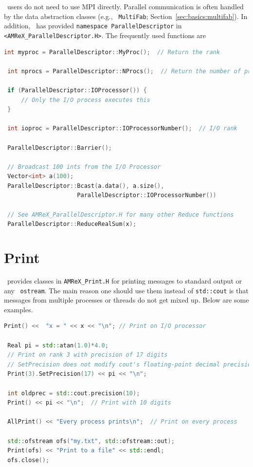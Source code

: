 \amrex\ users do not need to use MPI directly.  Parallel communication
is often handled by the data abstraction classes (e.g., {\tt
  MultiFab}; Section~\ref{sec:basics:multifab}).  In addition, \amrex\
has provided {\tt namespace ParallelDescriptor} in {\tt
  <AMReX\_ParallelDescriptor.H>}.  The frequently used functions are
\begin{lstlisting}[language=cpp]
 int myproc = ParallelDescriptor::MyProc();  // Return the rank
 
 int nprocs = ParallelDescriptor::NProcs();  // Return the number of processes
 
 if (ParallelDescriptor::IOProcessor()) { 
     // Only the I/O process executes this
 }
 
 int ioproc = ParallelDescriptor::IOProcessorNumber();  // I/O rank
 
 ParallelDescriptor::Barrier();
 
 // Broadcast 100 ints from the I/O Processor
 Vector<int> a(100);
 ParallelDescriptor::Bcast(a.data(), a.size(),
                     ParallelDescriptor::IOProcessorNumber())
 
 // See AMReX_ParallelDescriptor.H for many other Reduce functions 
 ParallelDescriptor::ReduceRealSum(x);
\end{lstlisting}

\section{Print}
\label{sec:basics:print}

\amrex\ provides classes in {\tt AMReX\_Print.H} for printing messages
to standard output or any \cpp\ {\tt ostream}.  The main reason one
should use them instead of {\tt std::cout} is that messages from
multiple processes or threads do not get mixed up.  Below are some
examples.
\begin{lstlisting}[language=cpp]
 Print() <<  "x = " << x << "\n"; // Print on I/O processor
 
 Real pi = std::atan(1.0)*4.0;
 // Print on rank 3 with precision of 17 digits
 // SetPrecision does not modify cout's floating-point decimal precision setting.
 Print(3).SetPrecision(17) << pi << "\n";

 int oldprec = std::cout.precision(10);
 Print() << pi << "\n";  // Print with 10 digits
 
 AllPrint() << "Every process prints\n";  // Print on every process
 
 std::ofstream ofs("my.txt", std::ofstream::out);
 Print(ofs) << "Print to a file" << std::endl;
 ofs.close();
\end{lstlisting}

